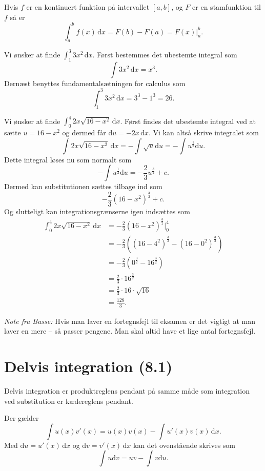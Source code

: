 \begin{sæt} 
  Hvis $f$ er en kontinuert funktion på intervallet $[a,b]$, og $F$ er en stamfunktion til $f$ så er
  \[ 
  \int_{a}^{b} f(x) \, \mathrm{d}x = F(b) - F(a) = F(x) \bigg|_a^{b}
  .\]
\end{sæt}

\begin{eks} 
  Vi ønsker at finde $\int_{1}^{3} 3x^2 \, \mathrm{d}x$.
  \bigbreak
  Først bestemmes det ubestemte integral som
  \[ 
  \int 3x^2 \, \mathrm{d}x = x^3
  .\]
  Dernæst benyttes fundamentalsætningen for calculus som
  \[ 
  \int_{1}^{3} 3x^2 \, \mathrm{d}x = 3^3 - 1^3 = 26
  .\]
\end{eks}

\begin{eks} 
  Vi ønsker at finde $\int_{0}^{4} 2x \sqrt{16 - x^2}\, \mathrm{d}x $.
  \bigbreak
  Først findes det ubestemte integral ved at sætte $u = 16 - x^2$ og dermed får $\mathrm{d}u = -2x \, \mathrm{d}x$. Vi kan altså skrive integralet som
  \[ 
  \int 2x \sqrt{16-x^2} \, \mathrm{d}x = -\int \sqrt{u} \mathrm{d}u = -\int u^{\frac{1}{2}} \mathrm{d}u
  .\]
  Dette integral løses nu som normalt som
  \[ 
  -\int u^{\frac{1}{2}} \mathrm{d}u = -\frac{2}{3} u^{\frac{3}{2}} + c
  .\]
  Dermed kan substitutionen sættes tilbage ind som
  \[ 
  -\frac{2}{3} \left( 16-x^2 \right)^{\frac{3}{2}} + c
  .\]
  Og slutteligt kan integrationsgrænserne igen indsættes som
  \begin{align*}
  \int_{0}^{4} 2x \sqrt{16-x^2} \, \mathrm{d}x &= -\frac{2}{3} \left( 16-x^2 \right)^{\frac{3}{2}} \bigg|_0^{4} \\
  &= -\frac{2}{3} \left( \left( 16-4^2 \right)^{\frac{3}{2}} - \left( 16-0^2 \right)^{\frac{3}{2}} \right) \\
  &= -\frac{2}{3}\left( 0^{\frac{3}{2}} - 16^{\frac{3}{2}} \right) \\
  &= \frac{2}{3} \cdot 16^{\frac{3}{2}} \\
  &= \frac{2}{3} \cdot 16 \cdot \sqrt{16} \\
  &= \frac{128}{3}
  .\end{align*}
\end{eks}
\textit{Note fra Basse:} Hvis man laver en fortegnsfejl til eksamen er det vigtigt at man laver en mere -- så passer pengene. Man skal altid have et lige antal fortegnsfejl.

\section{Delvis integration (8.1)}
Delvis integration er produktreglens pendant på samme måde som integration ved substitution er kædereglens pendant.
\begin{sæt}  \label{afs:delint}
  Der gælder
  \[
    \int u(x)v'(x) = u(x)v(x) - \int u'(x)v(x) \, \mathrm{d}x
  .\]
  Med $\mathrm{d}u = u'(x) \, \mathrm{d}x$ og $\mathrm{d}v = v'(x) \, \mathrm{d}x$ kan det ovenstående skrives som
  \[ 
  \int u \mathrm{d}v = uv - \int v \mathrm{d}u
  .\]
\end{sæt}

